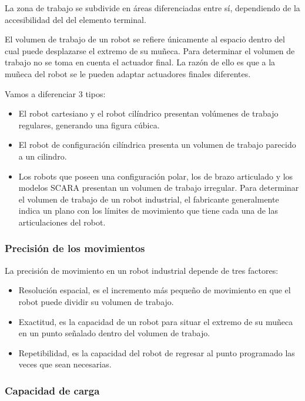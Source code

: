 \documentclass[12pt,a4paper]{report}
\begin{document}
La zona de trabajo se subdivide en áreas diferenciadas entre sí, dependiendo de
la accesibilidad del del elemento terminal.

El volumen de trabajo de un robot se refiere únicamente al espacio dentro del
cual puede desplazarse el extremo de su muñeca. Para determinar el volumen de
trabajo no se toma en cuenta el actuador final. La razón de ello es que a la
muñeca del robot se le pueden adaptar actuadores finales diferentes.

Vamos a diferenciar 3 tipos:
\begin{itemize}
    \item El robot cartesiano y el robot cilíndrico presentan volúmenes de
    trabajo regulares, generando una figura cúbica.
    \item El robot de configuración cilíndrica presenta un volumen de trabajo
    parecido a un cilindro.
    \item Los robots que poseen una configuración polar, los de brazo articulado
    y los modelos SCARA presentan un volumen de trabajo irregular. Para
    determinar el volumen de trabajo de un robot industrial, el fabricante
    generalmente indica un plano con los límites de movimiento que tiene cada
    una de las articulaciones del robot.
\end{itemize}


\subsubsection{Precisión de los movimientos}

La precisión de movimiento en un robot industrial depende de tres factores:

\begin{itemize}
    \item Resolución espacial, es el incremento más pequeño de movimiento en que
    el robot puede dividir su volumen de trabajo. 
    \item Exactitud, es la capacidad de un robot para situar el extremo de su
    muñeca en un punto señalado dentro del volumen de trabajo.
    \item Repetibilidad, es la capacidad del robot de regresar al punto
    programado las veces que sean necesarias. 
\end{itemize}


\subsubsection{Capacidad de carga}
\end{document}
